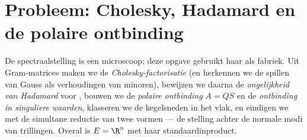 \section{Probleem: Cholesky, Hadamard en de polaire ontbinding}

\begin{problem}\label{pb:b2:quadratic:1}
De spectraalstelling is een microscoop; deze opgave gebruikt haar
als fabriek. Uit Gram-matrices maken we de
\emph{Cholesky-factorisatie} (en
herkennen we de spillen van Gauss als verhoudingen van minoren),
bewijzen we daarna de \emph{ongelijkheid van
Hadamard} voor ,
bouwen we de \emph{polaire ontbinding} $A
= QS$ en de \emph{ontbinding in singuliere waarden}, klasseren we
de kegelsneden in het vlak, en eindigen we met de simultane
reductie van twee vormen --- de stelling achter de normale modi van
trillingen. Overal is $E = \R^n$ met haar standaardinproduct.


\end{problem}
